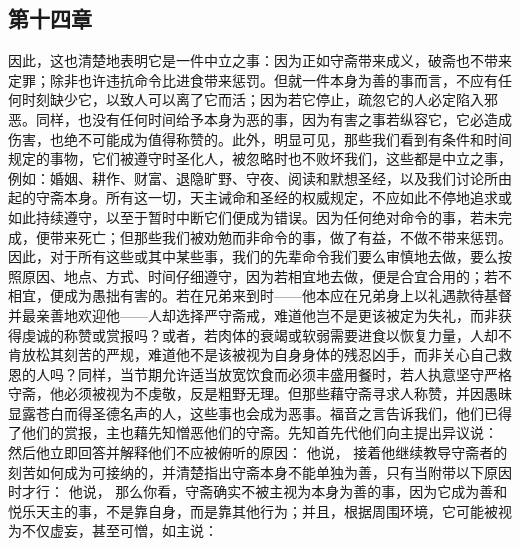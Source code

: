 
\subsection{第十四章}

\par

因此，这也清楚地表明它是一件中立之事：因为正如守斋带来成义，破斋也不带来定罪；除非也许违抗命令比进食带来惩罚。但就一件本身为善的事而言，不应有任何时刻缺少它，以致人可以离了它而活；因为若它停止，疏忽它的人必定陷入邪恶。同样，也没有任何时间给予本身为恶的事，因为有害之事若纵容它，它必造成伤害，也绝不可能成为值得称赞的。此外，明显可见，那些我们看到有条件和时间规定的事物，它们被遵守时圣化人，被忽略时也不败坏我们，这些都是中立之事，例如：婚姻、耕作、财富、退隐旷野、守夜、阅读和默想圣经，以及我们讨论所由起的守斋本身。所有这一切，天主诫命和圣经的权威规定，不应如此不停地追求或如此持续遵守，以至于暂时中断它们便成为错误。因为任何绝对命令的事，若未完成，便带来死亡；但那些我们被劝勉而非命令的事，做了有益，不做不带来惩罚。因此，对于所有这些或其中某些事，我们的先辈命令我们要么审慎地去做，要么按照原因、地点、方式、时间仔细遵守，因为若相宜地去做，便是合宜合用的；若不相宜，便成为愚拙有害的。若在兄弟来到时——他本应在兄弟身上以礼遇款待基督并最亲善地欢迎他——人却选择严守斋戒，难道他岂不是更该被定为失礼，而非获得虔诚的称赞或赏报吗？或者，若肉体的衰竭或软弱需要进食以恢复力量，人却不肯放松其刻苦的严规，难道他不是该被视为自身身体的残忍凶手，而非关心自己救恩的人吗？同样，当节期允许适当放宽饮食而必须丰盛用餐时，若人执意坚守严格守斋，他必须被视为不虔敬，反是粗野无理。但那些藉守斋寻求人称赞，并因愚昧显露苍白而得圣德名声的人，这些事也会成为恶事。福音之言告诉我们，他们已得了他们的赏报，主也藉先知憎恶他们的守斋。先知首先代他们向主提出异议说： 然后他立即回答并解释他们不应被俯听的原因： 他说， 接着他继续教导守斋者的刻苦如何成为可接纳的，并清楚指出守斋本身不能单独为善，只有当附带以下原因时才行： 他说，  那么你看，守斋确实不被主视为本身为善的事，因为它成为善和悦乐天主的事，不是靠自身，而是靠其他行为；并且，根据周围环境，它可能被视为不仅虚妄，甚至可憎，如主说： \par

